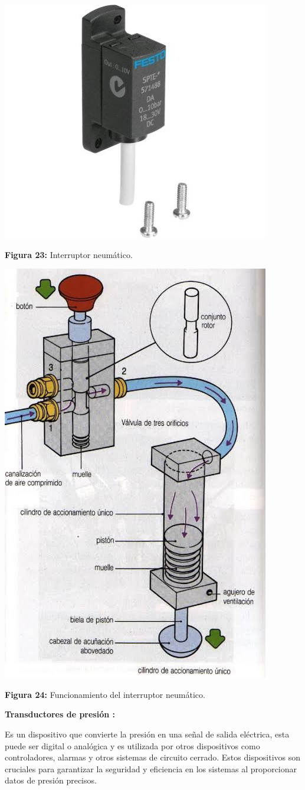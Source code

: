 \begin{center}
	\includegraphics[width=0.4\linewidth, height=0.2\textwidth]{img/neumatico}
	
	\vspace{2mm} %
	
	\textbf{Figura 23:} Interruptor neumático.
\end{center}

\vspace{5mm} %

\begin{center}
	\includegraphics[width=0.4\linewidth]{img/Sinterruptorneumatico}
	
	\vspace{2mm} %
	
	\textbf{Figura 24:} Funcionamiento del interruptor neumático.
\end{center}

\vspace{10mm}
\textbf{}
\textbf{Transductores de presión : }

Es un dispositivo que convierte la presión en una señal de salida eléctrica, esta puede ser digital o analógica y es utilizada por otros dispositivos como controladores, alarmas y otros sistemas de circuito cerrado. Estos dispositivos son cruciales para garantizar la seguridad y eficiencia en los sistemas al proporcionar datos de presión precisos. 


